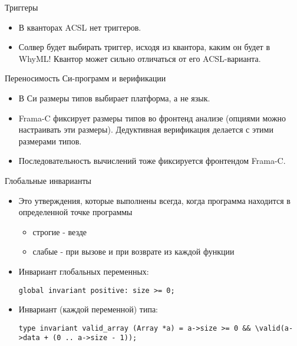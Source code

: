 \documentclass[hyperref={unicode=true}]{beamer}
\begin{document}
    \begin{frame}{Триггеры}
    \begin{itemize}
    \item
    В кванторах ACSL нет триггеров.
    \item
    Солвер будет выбирать триггер, исходя из квантора, каким
    он будет в WhyML! Квантор может сильно отличаться
    от его ACSL-варианта.
    \end{itemize}
    \end{frame}

    \begin{frame}{Переносимость Си-программ и верификации}
    \begin{itemize}
    \item
    В Си размеры типов выбирает платформа, а не язык.
    \item
    Frama-C фиксирует размеры типов во фронтенд анализе
    (опциями можно настраивать эти размеры). Дедуктивная
    верификация делается с этими размерами типов.
    \item
    Последовательность вычислений тоже фиксируется
    фронтендом Frama-C.
    \end{itemize}
    \end{frame}

    \begin{frame}{Глобальные инварианты}
    \begin{itemize}
    \item
    Это утверждения, которые выполнены всегда, когда
    программа находится в определенной точке программы
        \begin{itemize}
        \item строгие - везде
        \item слабые - при вызове и при возврате из
        каждой функции
        \end{itemize}
    \item Инвариант глобальных переменных:
    \begin{block}{}
    \texttt{global invariant positive: size >= 0;}
    \end{block}
    \item Инвариант (каждой переменной) типа:
    \begin{block}{}
    \texttt{type invariant valid\_array (Array *a) =
    a->size >= 0 \&\& \textbackslash{}valid(a->data + (0 .. a->size - 1));}
    \end{block}
    \end{itemize}
    \end{frame}
\end{document}
